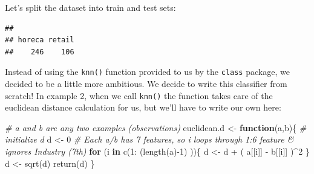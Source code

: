 \documentclass[
]{article}
\newenvironment{Shaded}{\begin{snugshade}}{\end{snugshade}}
\newcommand{\CommentTok}[1]{\textcolor[rgb]{0.56,0.35,0.01}{\textit{#1}}}
\newcommand{\ControlFlowTok}[1]{\textcolor[rgb]{0.13,0.29,0.53}{\textbf{#1}}}
\newcommand{\DecValTok}[1]{\textcolor[rgb]{0.00,0.00,0.81}{#1}}
\newcommand{\FunctionTok}[1]{\textcolor[rgb]{0.00,0.00,0.00}{#1}}
\newcommand{\NormalTok}[1]{#1}
\newcommand{\OtherTok}[1]{\textcolor[rgb]{0.56,0.35,0.01}{#1}}
\newcommand{\SpecialCharTok}[1]{\textcolor[rgb]{0.00,0.00,0.00}{#1}}
\begin{document}
Let's split the dataset into train and test sets:

\begin{Shaded}
\end{Shaded}

\begin{verbatim}
## 
## horeca retail 
##    246    106
\end{verbatim}

Instead of using the \texttt{knn()} function provided to us by the
\texttt{class} package, we decided to be a little more ambitious. We
decide to write this classifier from scratch! In example 2, when we call
\texttt{knn()} the function takes care of the euclidean distance
calculation for us, but we'll have to write our own here:

\begin{Shaded}
\begin{Highlighting}[]
\CommentTok{\# a and b are any two examples (observations)}
\NormalTok{euclidean.d }\OtherTok{\textless{}{-}} \ControlFlowTok{function}\NormalTok{(a,b)\{}
  \CommentTok{\# initialize d}
\NormalTok{  d }\OtherTok{\textless{}{-}} \DecValTok{0}  
  \CommentTok{\# Each a/b has 7 features, so i loops through 1:6 feature \& ignores Industry (7th)}
  \ControlFlowTok{for}\NormalTok{ (i }\ControlFlowTok{in} \FunctionTok{c}\NormalTok{(}\DecValTok{1}\SpecialCharTok{:}\NormalTok{ (}\FunctionTok{length}\NormalTok{(a)}\SpecialCharTok{{-}}\DecValTok{1}\NormalTok{) ))\{ }
\NormalTok{    d }\OtherTok{\textless{}{-}}\NormalTok{ d }\SpecialCharTok{+}\NormalTok{ ( a[[i]] }\SpecialCharTok{{-}}\NormalTok{ b[[i]] )}\SpecialCharTok{\^{}}\DecValTok{2}
\NormalTok{  \}}
\NormalTok{  d }\OtherTok{\textless{}{-}} \FunctionTok{sqrt}\NormalTok{(d)}
  \FunctionTok{return}\NormalTok{(d)}
\NormalTok{\}}
\end{Highlighting}
\end{Shaded}
\end{document}
